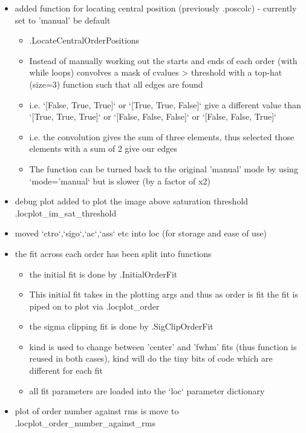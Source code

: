 \begin{itemize}
\item added function for locating central position (previously \spirouLOCOR.poscolc) - currently set to 'manual' be default
    \begin{itemize}
    \item \spirouLOCOR.LocateCentralOrderPositions
    \item  Instead of manually working out the starts and ends of each order (with while loops) convolves a mask of cvalues > threshold with a top-hat (size=3) function such that all edges are found
    \item i.e. `[False, True, True]` or `[True, True, False]` give a different value than `[True, True, True]` or `[False, False, False]` or `[False, False, True]`
    \item i.e. the convolution gives the sum of three elements, thus selected those elements with a sum of 2 give our edges
    \item The function can be turned back to the original 'manual' mode by using `mode='manual` but is slower (by a factor of x2)
	\end{itemize}

\item debug plot added to plot the image above saturation threshold \spirouPlot.locplot\_im\_sat\_threshold
        
\item moved `ctro`,`sigo`,`ac`,`ass` etc into loc (for storage and ease of use)        
        
\item the fit across each order has been split into functions
    \begin{itemize}
	\item the initial fit is done by \spirouLOCOR.InitialOrderFit
	\item This initial fit takes in the plotting args and thus as order is fit the fit is piped on to plot via \spirouPlot.locplot\_order
	\item the sigma clipping fit is done by \spirouLOCOR.SigClipOrderFit
	\item kind is used to change between 'center' and 'fwhm' fits (thus function is reused in both cases), kind will do the tiny bits of code which are different for each fit
	\item all fit parameters are loaded into the `loc` parameter dictionary
	\end{itemize}

\item plot of order number against rms is move to \spirouPlot.locplot\_order{\hskip 0pt}\_number\_against\_rms


\end{itemize}
